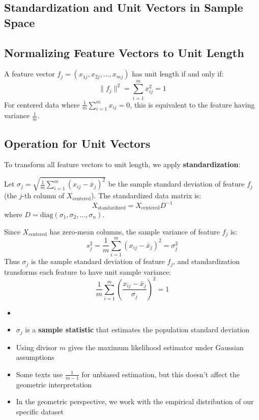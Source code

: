 \begin{notechapter}
\section{Standardization and Unit Vectors in Sample Space}

\subsection{Normalizing Feature Vectors to Unit Length}

\begin{theorem}
A feature vector $f_j = (x_{1j}, x_{2j}, \dots, x_{mj})$ has unit length if and only if:
\[
\|f_j\|^2 = \sum_{i=1}^m x_{ij}^2 = 1
\]
For centered data where $\frac{1}{m}\sum_{i=1}^m x_{ij} = 0$, this is equivalent to the feature having variance $\frac{1}{m}$.
\end{theorem}

\subsection{Operation for Unit Vectors}

To transform all feature vectors to unit length, we apply \textbf{standardization}:

\begin{definition}
Let $\sigma_j = \sqrt{\frac{1}{m}\sum_{i=1}^m (x_{ij} - \bar{x}_j)^2}$ be the sample standard deviation of feature $f_j$ (the $j$-th column of $X_{\text{centered}}$). The standardized data matrix is:
\[
X_{\text{standardized}} = X_{\text{centered}} D^{-1}
\]
where $D = \text{diag}(\sigma_1, \sigma_2, \dots, \sigma_n)$.
\end{definition}

\begin{remark}
Since $X_{\text{centered}}$ has zero-mean columns, the sample variance of feature $f_j$ is:
\[
s_j^2 = \frac{1}{m}\sum_{i=1}^m (x_{ij} - \bar{x}_j)^2 = \sigma_j^2
\]
Thus $\sigma_j$ is the sample standard deviation of feature $f_j$, and standardization transforms each feature to have unit sample variance:
\[
\frac{1}{m}\sum_{i=1}^m \left(\frac{x_{ij} - \bar{x}_j}{\sigma_j}\right)^2 = 1
\]
\end{remark}

\begin{remark}
\begin{itemize}
    \item[]
    \item $\sigma_j$ is a \textbf{sample statistic} that estimates the population standard deviation
    \item Using divisor $m$ gives the maximum likelihood estimator under Gaussian assumptions
    \item Some texts use $\frac{1}{m-1}$ for unbiased estimation, but this doesn't affect the geometric interpretation
    \item In the geometric perspective, we work with the empirical distribution of our specific dataset
\end{itemize}
\end{remark}


\end{notechapter}
